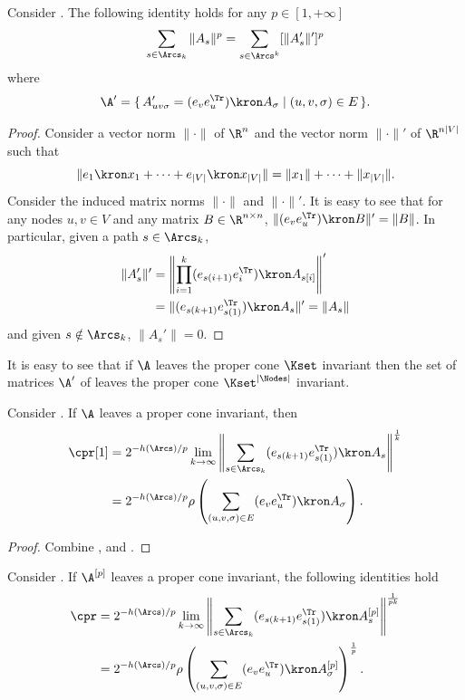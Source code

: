 \documentclass[11pt,twoside,a4paper,openright]{uclouvain-thesis}
\newcommand{\expfrac}[2]{#1/#2}
\begin{document}
\begin{mylem}
  \label{lem:koz}
  Consider .
  The following identity holds for any $p \in [1, +\infty]$
  \[
    \sum_{s \in \Arcs_k} \|A_s\|^p =
    \sum_{s \in \Arcs^k} [\|A_s'\|']^p
  \]
  where
  \[ \A' = \{\, A'_{uv\sigma} = (e_ve_u^\Tr) \kron A_\sigma \mid (u,v,\sigma) \in E \,\}. \]
  \begin{proof}
    Consider a vector norm $\|\cdot\|$ of $\R^n$ and
    the vector norm $\|\cdot\|'$ of $\R^{n|V|}$ such that
    \[ \|e_1 \kron x_1 + \cdots + e_{|V|} \kron x_{|V|}\| = \|x_1\| + \cdots + \|x_{|V|}\|. \]
    Consider the induced matrix norms $\|\cdot\|$ and $\|\cdot\|'$.
    It is easy to see that for any nodes $u,v \in V$ and any matrix $B \in \R^{n \times n}$,
    $\|(e_ve_u^\Tr) \kron B\|' = \|B\|$.
    In particular, given a path $s \in \Arcs_k$,
    \begin{align*}
      \|A_s'\|' & = \left\|\prod_{i=1}^k(e_{s(i+1)}e_i^\Tr) \kron A_{s[i]}\right\|'\\
      & = \|(e_{s(k+1)}e_{s(1)}^\Tr) \kron A_s\|' = \|A_s\|
    \end{align*}
    and given $s \notin \Arcs_k$, $\|A_s'\| = 0$.
  \end{proof}
\end{mylem}

It is easy to see that if $\A$ leaves the proper cone $\Kset$ invariant then
the set of matrices $\A'$ of  leaves the proper cone $\Kset^{|\Nodes|}$ invariant.

\begin{mylem}
  \label{lem:constrainedinv}
  Consider .
  If $\A$ leaves a proper cone invariant, then
  \begin{align*}
    \cpr[1]
    & = 2^{-\expfrac{h(\Arcs)}{p}}\lim_{k\to\infty} \left\|\sum_{s \in \Arcs_k}(e_{s(k+1)}e_{s(1)}^\Tr) \kron A_s\right\|^{\frac{1}{k}}\\
    & = 2^{-\expfrac{h(\Arcs)}{p}}\rho\left(\sum_{(u,v,\sigma) \in E}(e_ve_u^\Tr) \kron A_\sigma\right).
  \end{align*}
  \begin{proof}
    Combine ,  and .
  \end{proof}
\end{mylem}

\begin{mytheo}
  \label{theo:norminout}
  Consider .
  If $\A^{[p]}$ leaves a proper cone invariant,
  the following identities hold
  \begin{align*}
    \cpr
    & = 2^{-\expfrac{h(\Arcs)}{p}}\lim_{k\to\infty} \left\|\sum_{s \in \Arcs_k}(e_{s(k+1)}e_{s(1)}^\Tr) \kron A_s^{[p]}\right\|^{\frac{1}{pk}}\\
    & = 2^{-\expfrac{h(\Arcs)}{p}}\rho\left(\sum_{(u,v,\sigma) \in E}(e_ve_u^\Tr) \kron A_\sigma^{[p]}\right)^{\frac{1}{p}}.
  \end{align*}
\end{mytheo}
\end{document}
